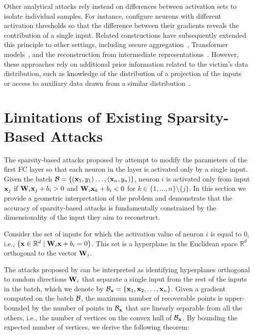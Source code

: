 Other analytical attacks rely instead on differences between activation sets to isolate individual samples. For instance,  configure neurons with different activation thresholds so that the difference between their gradients reveals the contribution of a single input. Related constructions have subsequently extended this principle to other settings, including secure aggregation~\cite{zhaoLOKILargescaleData2023a}, Transformer models~\cite{fowlDecepticonsCorruptedTransformers2022,chu2023panning}, and the reconstruction from intermediate representations~\cite{shiScaleMIAScalableModel2025}. However, these approaches rely on additional prior information related to the victim's data distribution, such as knowledge of the distribution of a projection of the inputs~\cite{fowlRobbingFedDirectly2021,fowlDecepticonsCorruptedTransformers2022,chu2023panning, zhaoLOKILargescaleData2023a} or access to auxiliary data drawn from a similar distribution~\cite{shiScaleMIAScalableModel2025}.

\section{Limitations of Existing Sparsity-Based Attacks}\label{sec:limit}

The sparsity-based attacks proposed by  attempt to modify the parameters of the first FC layer so that each neuron in the layer is activated only by a single input.
Given the batch  $\mathcal{B}=\{({\mathbf{x}}_1, y_1) \dots, ({\mathbf{x}}_n, y_n)\}$, neuron $i$ is activated only from input ${\mathbf{x}}_j$ if $\mathbf{W}_i {\mathbf{x}}_j+b_i>0$ and $\mathbf{W}_i {\mathbf{x}}_k+b_i<0$ for $k \in \{1, \dots, n\}\setminus \{j\}$.
In this section we provide a geometric interpretation of the problem and demonstrate that the accuracy of sparsity-based attacks is fundamentally constrained by the dimensionality of the input they aim to reconstruct.

Consider the set of inputs for which the activation value of neuron $i$ is equal to $0$, i.e., $    \{ {\mathbf{x}} \in \mathbb{R}^d \mid \mathbf{W}_i{\mathbf{x}} + b_i= 0\}$.
This set is a hyperplane in the Euclidean space $\mathbb R^d$ orthogonal to the vector $\mathbf{W}_i$.

The attacks proposed by  can be interpreted as identifying hyperplanes orthogonal to random directions $\mathbf{W}_i$ that separate a single input from the rest of the inputs in the batch, which we denote by $\mathcal{B}_{{\mathbf{x}}}= \{{\mathbf{x}}_1, {\mathbf{x}}_2, \dots, {\mathbf{x}}_n\}$. Given a gradient computed on the batch $\mathcal{B}$, the maximum number of recoverable points is upper-bounded by the number of points in $\mathcal{B}_{{\mathbf{x}}}$ that are linearly separable from all the others, i.e., the number of vertices on the convex hull of $\mathcal{B}_{{\mathbf{x}}}$. By bounding the expected number of vertices, we derive the following theorem:

